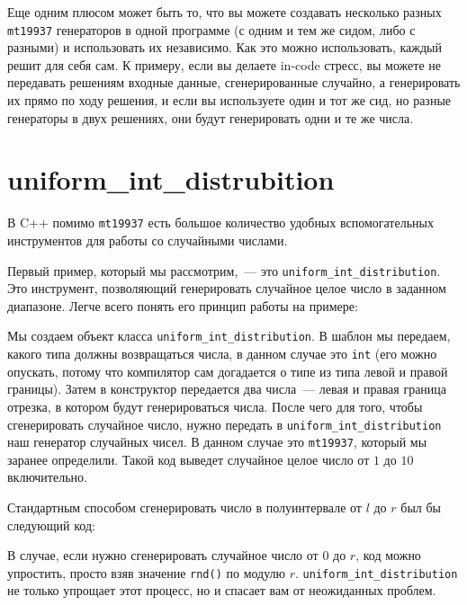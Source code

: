 Еще одним плюсом может быть то, что вы можете создавать несколько разных \verb+mt19937+ генераторов в одной программе (с одним и тем же сидом, либо с разными) и использовать их независимо. Как это можно использовать, каждый решит для себя сам. К примеру, если вы делаете in-code стресс, вы можете не передавать решениям входные данные, сгенерированные случайно, а генерировать их прямо по ходу решения, и если вы используете один и тот же сид, но разные генераторы в двух решениях, они будут генерировать одни и те же числа.

\section{uniform\_int\_distrubition}

В C++ помимо \verb+mt19937+ есть большое количество удобных вспомогательных инструментов для работы со случайными числами.

Первый пример, который мы рассмотрим,~--- это \verb+uniform_int_distribution+. Это инструмент, позволяющий генерировать случайное целое число в заданном диапазоне. Легче всего понять его принцип работы на примере:



Мы создаем объект класса \verb+uniform_int_distribution+. В шаблон мы передаем, какого типа должны возвращаться числа, в данном случае это \verb+int+ (его можно опускать, потому что компилятор сам догадается о типе из типа левой и правой границы). Затем в конструктор передается два числа~--- левая и правая граница отрезка, в котором будут генерироваться числа. После чего для того, чтобы сгенерировать случайное число, нужно передать в \verb+uniform_int_distribution+ наш генератор случайных чисел. В данном случае это \verb+mt19937+, который мы заранее определили. Такой код выведет случайное целое число от $1$ до $10$ включительно.

Стандартным способом сгенерировать число в полуинтервале от $l$ до $r$ был бы следующий код:



В случае, если нужно сгенерировать случайное число от $0$ до $r$, код можно упростить, просто взяв значение \verb+rnd()+ по модулю $r$. \verb+uniform_int_distribution+ не только упрощает этот процесс, но и спасает вам от неожиданных проблем.

